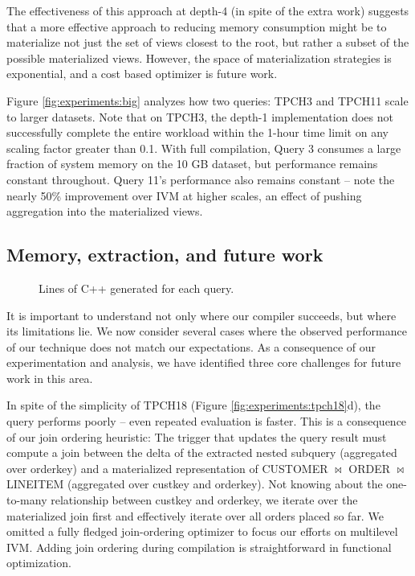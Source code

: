 The effectiveness of this approach at depth-4 (in spite of the extra work) suggests that a more effective approach to reducing memory consumption might be to materialize not just the set of views closest to the root, but rather a subset of the possible materialized views.  However, the space of materialization strategies is exponential, and a cost based optimizer is future work.

Figure \ref{fig:experiments:big} analyzes how two queries: TPCH3 and TPCH11 scale to larger datasets.  Note that on TPCH3, the depth-1 implementation does not successfully complete the entire workload within the 1-hour time limit on any scaling factor greater than 0.1.  With full compilation, Query 3 consumes a large fraction of system memory on the 10 GB dataset, but performance remains constant throughout.  Query 11's performance also remains constant -- note the nearly 50\% improvement over IVM at higher scales, an effect of pushing aggregation into the materialized views.

\subsection{Memory, extraction, and future work}
\label{sec:experiments:future}

\begin{figure}
\begin{center}

\caption{Lines of C++ generated for each query.}
\label{fig:experiments:loc}
\end{center}
\vspace*{-0.35in}
\end{figure}

It is important to understand not only where our compiler succeeds, but where its limitations lie.  We now consider several cases where the observed performance of our technique does not match our expectations.  As a consequence of our experimentation and analysis, we have identified three core challenges for future work in this area.

In spite of the simplicity of TPCH18 (Figure \ref{fig:experiments:tpch18}d), the query performs poorly -- even repeated evaluation is faster.  This is a consequence of our join ordering heuristic: The trigger that updates the query result must compute a join between the delta of the extracted nested subquery (aggregated over orderkey) and a materialized representation of CUSTOMER $\bowtie$ ORDER $\bowtie$ LINEITEM (aggregated over custkey and orderkey).  
Not knowing about the one-to-many relationship between custkey and orderkey, we iterate over the materialized join first and effectively iterate over all orders placed so far.
We omitted a fully fledged join-ordering optimizer to focus our efforts on multilevel IVM. Adding join ordering during compilation is straightforward in functional optimization.

